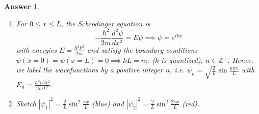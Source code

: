 \documentclass[a4paper]{article}
\newtheorem{ans}{Answer}[subsection]
\theoremstyle{new}
\begin{document}
\begin{ans}\leavevmode
\begin{enumerate}[label=(\alph*)]
\item For $0\leq x\leq L$, the Schrodinger equation is
$$-\frac{\hbar^2}{2m}\frac{d^2\psi}{dx^2}=E\psi\implies\psi=e^{ikx}$$
with energies $E=\frac{\hbar^2k^2}{2m}$ and satisfy the boundary conditions $\psi(x=0)=\psi(x=L)=0\implies kL=n\pi$ ($k$ is quantized), $n\in\mathbb{Z}^+$. Hence, we label the wavefunctions by a positive integer $n$, i.e. $\psi_n=\sqrt{\frac{2}{L}}\sin\frac{n\pi x}{L}$ with $E_n=\frac{\hbar^2n^2\pi^2}{2mL^2}$.
\item Sketch $|\psi_1|^2=\frac{2}{L}\sin^2\frac{\pi x}{L}$ (blue) and $|\psi_2|^2=\frac{2}{L}\sin^2\frac{2\pi x}{L}$ (red). 
\begin{center}
\end{center}


\end{enumerate}
\end{ans}
\end{document}
